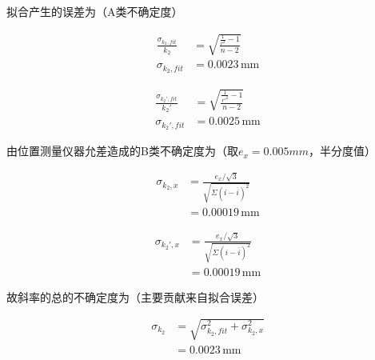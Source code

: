 \documentclass[10pt, twocolumn]{article}
\begin{document}
\par 
拟合产生的误差为（A类不确定度）\\
\begin{minipage}{0.23\textwidth}
\begin{equation*}
    \begin{aligned}
        \frac{\sigma_{k_2,fit}}{k_2} &= \sqrt{\frac{\frac{1}{r^2}-1}{n-2}} \\
        \sigma_{k_2,fit} &= 0.0023\,\text{mm}
    \end{aligned}
\end{equation*}
\end{minipage}
\begin{minipage}{0.23\textwidth}
\begin{equation*}
    \begin{aligned}
        \frac{\sigma_{k_2',fit}}{k_2'} &= \sqrt{\frac{\frac{1}{r'^2}-1}{n-2}} \\
        \sigma_{k_2',fit} &= 0.0025\,\text{mm}
    \end{aligned}
\end{equation*}
\end{minipage}
\par 
由位置测量仪器允差造成的B类不确定度为（取$e_x=0.005mm$，半分度值）\\
\begin{minipage}{0.23\textwidth}
\begin{equation*}
    \begin{aligned}
        \sigma_{k_2,x} &= \frac{e_x/\sqrt{3}}{\sqrt{\Sigma(i-\overline{i})^2}} \\
        &= 0.00019\,\text{mm}
    \end{aligned}
\end{equation*}
\end{minipage}
\begin{minipage}{0.23\textwidth}
\begin{equation*}
    \begin{aligned}
        \sigma_{k_2',x} &= \frac{e_x/\sqrt{3}}{\sqrt{\Sigma(i-\overline{i})^2}} \\
        &= 0.00019\,\text{mm}
    \end{aligned}
\end{equation*}
\end{minipage}
\par
故斜率的总的不确定度为（主要贡献来自拟合误差）\\
\begin{minipage}{0.23\textwidth}
\begin{equation*}
    \begin{aligned}
        \sigma_{k_2} &= \sqrt{\sigma_{k_2,fit}^2+\sigma_{k_2,x}^2} \\
        &= 0.0023\,\text{mm}
    \end{aligned}
\end{equation*}
\end{minipage}
\end{document}
